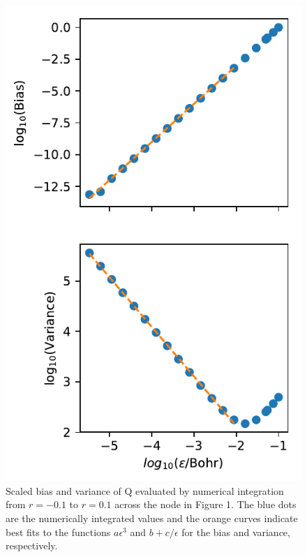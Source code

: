 \documentclass{article}
\begin{document}
\begin{figure}
\centering
\includegraphics{../plots/integratenode.pdf}
\caption{Scaled bias and variance of Q evaluated by numerical integration from $r = -0.1$ to $r = 0.1$ across the node in Figure 1. The blue dots are the numerically integrated values and the orange curves indicate best fits to the functions $a\epsilon^3$ and $b + c/\epsilon$ for the bias and variance, respectively.}
\end{figure}
\end{document}
